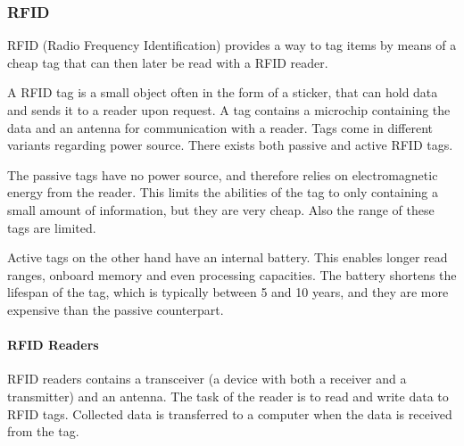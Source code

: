 \subsubsection{RFID}
RFID (Radio Frequency Identification) provides a way to tag items by means of a cheap tag that can then later be read with a RFID reader.

A RFID tag is a small object often in the form of a sticker, that can hold data and sends it to a reader upon request.
A tag contains a microchip containing the data and an antenna for communication with a reader.
Tags come in different variants regarding power source.
There exists both passive and active RFID tags.\cite{rfidreview}

The passive tags have no power source, and therefore relies on electromagnetic energy from the reader.
This limits the abilities of the tag to only containing a small amount of information, but they are very cheap.
Also the range of these tags are limited. \cite{rfidreview}

Active tags on the other hand have an internal battery.
This enables longer read ranges, onboard memory and even processing capacities.
The battery shortens the lifespan of the tag, which is typically between 5 and 10 years, and they are more expensive than the passive counterpart. \cite{rfidreview}

\paragraph{RFID Readers}
RFID readers contains a transceiver (a device with both a receiver and a transmitter) and an antenna.
The task of the reader is to read and write data to RFID tags.
Collected data is transferred to a computer when the data is received from the tag.\cite{rfidreview}